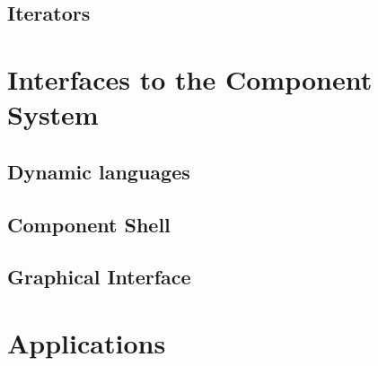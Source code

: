 \documentclass[12pt]{scrartcl}
\begin{document}


\subsection{Iterators}





\section{Interfaces to the Component System}


\subsection{Dynamic languages}


\subsection{Component Shell}


\subsection{Graphical Interface}



\section{Applications}








\end{document}
